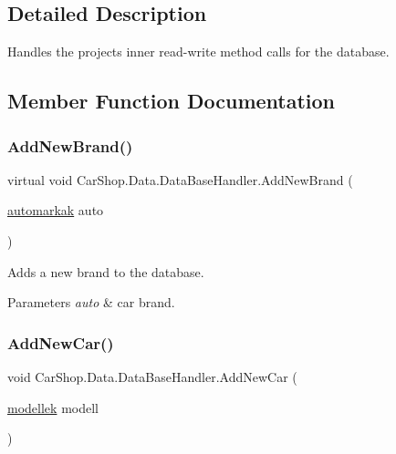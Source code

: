 \subsection{Detailed Description}
Handles the projects inner read-\/write method calls for the database. 



\subsection{Member Function Documentation}
\mbox{\label{class_car_shop_1_1_data_1_1_data_base_handler_ab75102127241cfcc67aecbbc21f6ad59}} 
\subsubsection{\texorpdfstring{Add\+New\+Brand()}{AddNewBrand()}}
{\footnotesize\ttfamily virtual void Car\+Shop.\+Data.\+Data\+Base\+Handler.\+Add\+New\+Brand (\begin{DoxyParamCaption}\item[{\mbox{\hyperlink{class_car_shop_1_1_data_1_1automarkak}{automarkak}}}]{auto }\end{DoxyParamCaption})\hspace{0.3cm}{\ttfamily [virtual]}}



Adds a new brand to the database. 


\begin{DoxyParams}{Parameters}
{\em auto} & car brand.\\
\hline
\end{DoxyParams}
\mbox{\label{class_car_shop_1_1_data_1_1_data_base_handler_aab105b74a843101ccc77a235e177badc}} 
\subsubsection{\texorpdfstring{Add\+New\+Car()}{AddNewCar()}}
{\footnotesize\ttfamily void Car\+Shop.\+Data.\+Data\+Base\+Handler.\+Add\+New\+Car (\begin{DoxyParamCaption}\item[{\mbox{\hyperlink{class_car_shop_1_1_data_1_1modellek}{modellek}}}]{modell }\end{DoxyParamCaption})}



